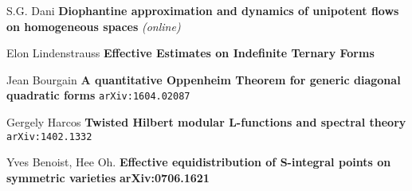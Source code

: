 \documentclass[12pt]{article}
\begin{document}
\newpage



\selectfont \fontsize{12}{10}\selectfont

\begin{thebibliography}{}

\item S.G. Dani \textbf{Diophantine approximation and dynamics of unipotent flows on homogeneous spaces} \textit{(online)}

\item Elon Lindenstrauss \textbf{Effective Estimates on Indefinite Ternary Forms}

\item Jean Bourgain
\textbf{A quantitative Oppenheim Theorem for generic diagonal quadratic forms} \texttt{arXiv:1604.02087}

\item Gergely Harcos \textbf{Twisted Hilbert modular L-functions and spectral theory} \texttt{arXiv:1402.1332}

\item Yves Benoist, Hee Oh. \textbf{Effective equidistribution of S-integral points on symmetric varieties} \textbf{arXiv:0706.1621}

\end{thebibliography}
\end{document}
